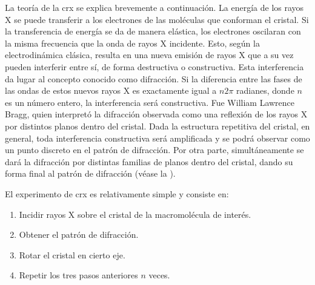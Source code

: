 La teoría de la \acrshort{crx} se explica brevemente a continuación. La energía de los rayos X se puede transferir a los electrones de las moléculas que conforman el cristal. Si la transferencia de energía se da de manera elástica, los electrones oscilaran con la misma frecuencia que la onda de rayos X incidente. Esto, según la electrodinámica clásica, resulta en una nueva emisión de rayos X que a su vez pueden interferir entre sí, de forma destructiva o constructiva. Esta interferencia da lugar al concepto conocido como difracción. Si la diferencia entre las fases de las ondas de estos nuevos rayos X es exactamente igual a $n2\pi$ radianes, donde $n$ es un número entero, la interferencia será constructiva. Fue William Lawrence Bragg, quien interpretó la difracción observada como una reflexión de los rayos X por distintos planos dentro del cristal. Dada la estructura repetitiva del cristal, en general, toda interferencia constructiva será amplificada y se podrá observar como un punto discreto en el patrón de difracción. Por otra parte, simultáneamente se dará la difracción por distintas familias de planos dentro del cristal, dando su forma final al patrón de difracción (véase la ). 

El experimento de \acrshort{crx} es relativamente simple y consiste en:

\begin{enumerate}
	\item Incidir rayos X sobre el cristal de la macromolécula de interés. 
	\item Obtener el patrón de difracción. 
	\item Rotar el cristal en cierto eje. 
	\item Repetir los tres pasos anteriores $n$ veces.
\end{enumerate}

